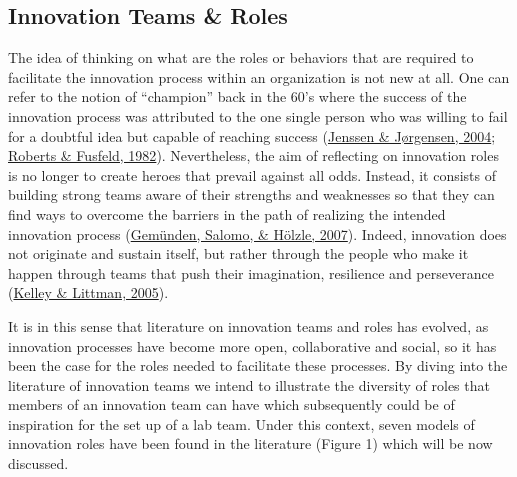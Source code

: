 \documentclass[]{elsarticle} %
\begin{document}
\hypertarget{innovation-teams-roles}{%
\subsection{Innovation Teams \& Roles}\label{innovation-teams-roles}}

The idea of thinking on what are the roles or behaviors that are
required to facilitate the innovation process within an organization is
not new at all. One can refer to the notion of ``champion'' back in the
60's where the success of the innovation process was attributed to the
one single person who was willing to fail for a doubtful idea but
capable of reaching success (\protect\hyperlink{ref-Jenssen2004}{Jenssen
\& Jørgensen, 2004}; \protect\hyperlink{ref-Roberts1982}{Roberts \&
Fusfeld, 1982}). Nevertheless, the aim of reflecting on innovation roles
is no longer to create heroes that prevail against all odds. Instead, it
consists of building strong teams aware of their strengths and
weaknesses so that they can find ways to overcome the barriers in the
path of realizing the intended innovation process
(\protect\hyperlink{ref-Gemunden2007}{Gemünden, Salomo, \& Hölzle,
2007}). Indeed, innovation does not originate and sustain itself, but
rather through the people who make it happen through teams that push
their imagination, resilience and perseverance
(\protect\hyperlink{ref-Kelley2005}{Kelley \& Littman, 2005}).

It is in this sense that literature on innovation teams and roles has
evolved, as innovation processes have become more open, collaborative
and social, so it has been the case for the roles needed to facilitate
these processes. By diving into the literature of innovation teams we
intend to illustrate the diversity of roles that members of an
innovation team can have which subsequently could be of inspiration for
the set up of a lab team. Under this context, seven models of innovation
roles have been found in the literature (Figure 1) which will be now
discussed.
\end{document}

